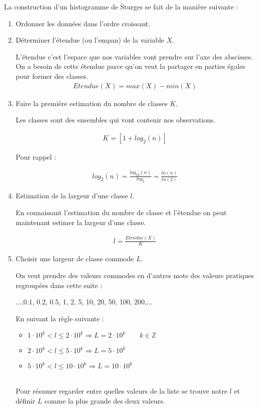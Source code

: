 \documentclass{report}
\begin{document}
La construction d'un histogramme de Sturges se fait de la manière suivante :

\begin{enumerate}
  \item Ordonner les données dans l'ordre croissant.
  \item Déterminer l'étendue (ou l'empan) de la variable $X$.
  
   L'étendue c'est l'espace que nos variables vont prendre sur l'axe des abscisses. On a besoin de cette étendue parce qu'on veut la partager en parties égales pour former des classes.
  \begin{align*}
  Etendue(X) = max(X) - min(X)
  \end{align*} 
  \quad
  \item Faire la première estimation du nombre de classes $K$.
  
  Les classes sont des ensembles qui vont contenir nos observations.

  \begin{align*}
  K = [1+log_2(n)]
  \end{align*} 

Pour rappel : 

  \begin{align*}
  log_2(n) = \frac{log_{10}(n)}{log_2} = \frac{ln(n)}{ln(2)} 
  \end{align*} 
  
  \item Estimation de la largeur d'une classe $l$.

  En connaissant l'estimation du nombre de classe et l'étendue on peut maintenant estimer la largeur d'une classe.
  
  \begin{align*}
  l = \frac{Etendue(X)}{K}
  \end{align*}

  \item Choisir une largeur de classe commode $L$.
  
  On veut prendre des valeurs commodes en d'autres mots des valeurs pratiques regroupées dans cette suite :

  \begin{center}
        ...,0.1, 0.2, 0.5, 1, 2, 5, 10, 20, 50, 100, 200,...
  \end{center}
  \quad

  En suivant la règle suivante : \\
  
  \begin{itemize}
  \item $1\cdot10^k<l\leq2\cdot10^k\Rightarrow L = 2\cdot10^k \qquad k\in\mathbb{Z} $
  \item $2\cdot10^k<l\leq5\cdot10^k\Rightarrow L = 5\cdot10^k$
  \item $5\cdot10^k<l\leq10\cdot10^k\Rightarrow L = 10\cdot10^k$
\end{itemize}
\quad\\
Pour résumer regarder entre quelles valeurs de la liste se trouve notre $l$ et définir $L$ comme la plus grande des deux valeurs.


\end{enumerate}
\end{document}
